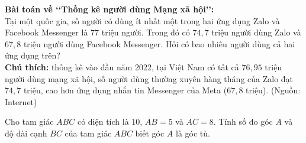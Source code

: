 \begin{bt}%
	\textbf{Bài toán về \lq\lq Thống kê người dùng Mạng xã hội\rq\rq:}\\
	Tại một quốc gia, số người có dùng ít nhất một trong hai ứng dụng Zalo và Facebook Messenger là $77$ triệu người. Trong đó có $74{,}7$ triệu người dùng Zalo và $67{,}8$ triệu người dùng Facebook Messenger. Hỏi có bao nhiêu người dùng cả hai ứng dụng trên?\\
	\textbf{Chú thích:} thống kê vào đầu năm 2022, tại Việt Nam có tất cả $76{,}95$ triệu người dùng mạng xã hội, số người dùng thường xuyên hàng tháng của Zalo đạt $74{,}7$ triệu, cao hơn ứng dụng nhắn tin Messenger của Meta ($67{,}8$ triệu). (Nguồn: Internet)
\end{bt}
\begin{bt}%
	Cho tam giác $ABC$ có diện tích là $10$, $AB=5$ và $AC=8$. Tính số đo góc $A$ và độ dài cạnh $BC$ của tam giác $ABC$ biết góc $A$ là góc tù.
\end{bt}
